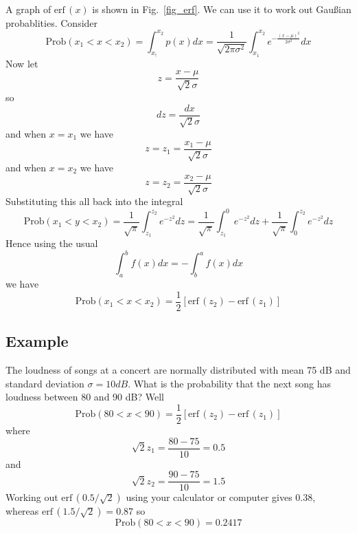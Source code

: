\documentclass[11pt,a4paper]{scrartcl}
\begin{document}
A graph of $\mbox{erf}\,(x)$ is shown in Fig.~\ref{fig_erf}. We can use it to work out Gau\ss{}ian probablities. Consider
\begin{equation}
\mbox{Prob}(x_1<x<x_2)=\int_{x_!}^{x_2} p(x)dx=\frac{1}{\sqrt{2\pi\sigma^2}}\int_{x_1}^{x_2} e^{-\frac{(x-\mu)^2}{2\sigma^2}}dx 
\end{equation}
Now let
\begin{equation}
z=\frac{x-\mu}{\sqrt{2}\sigma}
\end{equation}
so 
\begin{equation}
dz=\frac{dx}{\sqrt{2}\sigma}
\end{equation}
and when $x=x_1$ we have
\begin{equation}
z=z_1=\frac{x_1-\mu}{\sqrt{2}\sigma}
\end{equation}
and when $x=x_2$ we have
\begin{equation}
z=z_2=\frac{x_2-\mu}{\sqrt{2}\sigma}
\end{equation}
Substituting this all back into the integral
\begin{equation}
\mbox{Prob}(x_1<y<x_2)=\frac{1}{\sqrt{\pi}}\int_{z_1}^{z_2} e^{-z^2}dz=\frac{1}{\sqrt{\pi}}\int_{z_1}^{0} e^{-z^2}dz+\frac{1}{\sqrt{\pi}}\int_{0}^{z_2} e^{-z^2}dz
\end{equation}
Hence using the usual 
\begin{equation}
\int_a^bf(x)dx=-\int_b^a f(x)dx
\end{equation}
we have
\begin{equation}
\mbox{Prob}(x_1<x<x_2)=\frac{1}{2}[\mbox{erf}\,(z_2)-\mbox{erf}\,(z_1)]
\end{equation}

\subsection*{Example}

The loudness of songs at a concert are normally distributed with mean 75 dB and standard deviation $\sigma=10 dB$. What is the probability that the next song has loudness between 80 and 90 dB? Well
\begin{equation}
\mbox{Prob}(80<x<90)=\frac{1}{2}[\mbox{erf}\,(z_2)-\mbox{erf}\,(z_1)]
\end{equation}
where 
\begin{equation}
\sqrt{2}z_1=\frac{80-75}{10}=0.5
\end{equation}
and 
\begin{equation}
\sqrt{2}z_2=\frac{90-75}{10}=1.5
\end{equation}
Working out $\mbox{erf}\,(0.5/\sqrt{2})$ using your calculator or computer gives 0.38, whereas $\mbox{erf}\,(1.5/\sqrt{2})=0.87$ so
\begin{equation}
\mbox{Prob}(80<x<90)=0.2417
\end{equation}

\newpage

\end{document}
